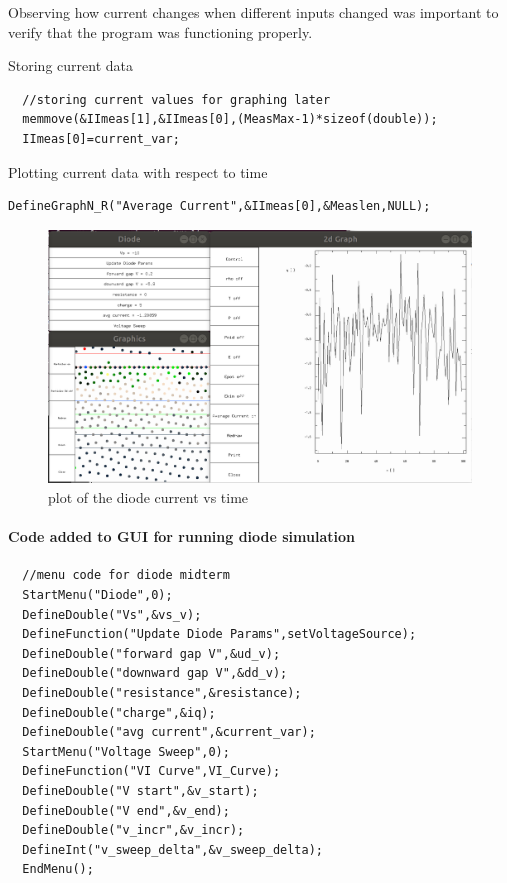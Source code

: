 \documentclass[a4paper]{article}
\begin{document}
Observing how current changes when different inputs changed was important to verify that the program was functioning properly.

Storing current data
\begin{verbatim}
  //storing current values for graphing later
  memmove(&IImeas[1],&IImeas[0],(MeasMax-1)*sizeof(double));
  IImeas[0]=current_var;
\end{verbatim}

Plotting current data with respect to time
\begin{verbatim}
DefineGraphN_R("Average Current",&IImeas[0],&Measlen,NULL);
\end{verbatim}

\begin{figure}[H]
\centering
\includegraphics[scale=0.2]{current_graph.png}
\caption{\label{fig} plot of the diode current vs time}
\end{figure}



\paragraph{Code added to GUI for running diode simulation}
\begin{verbatim}
  //menu code for diode midterm
  StartMenu("Diode",0);
  DefineDouble("Vs",&vs_v);
  DefineFunction("Update Diode Params",setVoltageSource);
  DefineDouble("forward gap V",&ud_v);
  DefineDouble("downward gap V",&dd_v);
  DefineDouble("resistance",&resistance);
  DefineDouble("charge",&iq);
  DefineDouble("avg current",&current_var);
  StartMenu("Voltage Sweep",0);
  DefineFunction("VI Curve",VI_Curve);
  DefineDouble("V start",&v_start);
  DefineDouble("V end",&v_end);
  DefineDouble("v_incr",&v_incr);
  DefineInt("v_sweep_delta",&v_sweep_delta);
  EndMenu();
\end{verbatim}
\end{document}
